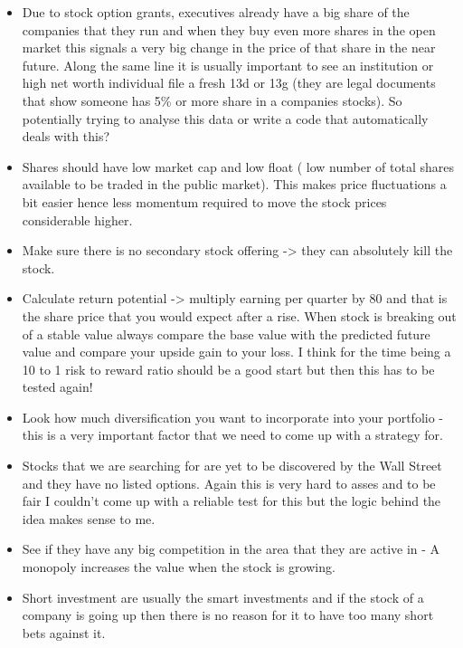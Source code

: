 \documentclass[12 pt]{article}
\begin{document}
\begin{itemize}
\item Due to stock option grants, executives already have a big share of the companies that they run and when they buy even more shares in the open market this signals a very big change in the price of that share in the near future. Along the same line it is usually important to see an institution or high net worth individual file a fresh 13d or 13g (they are legal documents that show someone has 5\% or more share in a companies stocks). So potentially trying to analyse this data or write a code that automatically deals with this?

\item Shares should have low market cap and low float ( low number of total shares available to be traded in the public market). This makes price fluctuations a bit easier hence less momentum required to move the stock prices considerable higher.

\item  Make sure there is no secondary stock offering -> they can absolutely kill the stock. 

\item Calculate return potential -> multiply earning per quarter by 80 and that is the share price that you would expect after a rise. When stock is breaking out of a stable value always compare the base value with the predicted future value and compare your upside gain to your loss. I think for the time being a 10 to 1 risk to reward ratio should be a good start but then this has to be tested again!

\item Look how much diversification you want to incorporate into your portfolio - this is a very important factor that we need to come up with a strategy for. 

\item Stocks that we are searching for are yet to be discovered by the Wall Street and they have no listed options. Again this is very hard to asses and to be fair I couldn't come up with a reliable test for this but the logic behind the idea makes sense to me. 
\item See if they have any big competition in the area that they are active in -  A monopoly increases the value when the stock is growing.  

\item Short investment are usually the smart investments and if the stock of a company is going up then there is no reason for it to have too many short bets against it.


\end{itemize}
\end{document}
